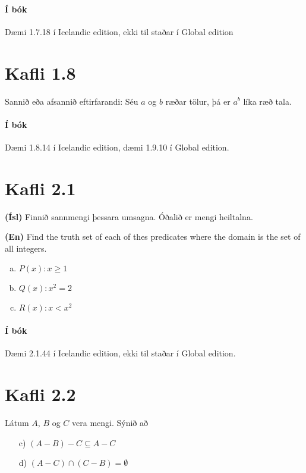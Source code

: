 \documentclass{article}
\begin{document}
\paragraph{Í bók} Dæmi 1.7.18 í Icelandic edition, ekki til staðar í Global edition

\section{Kafli 1.8}

\question

Sannið eða afsannið eftirfarandi: Séu $a$ og $b$ ræðar tölur, þá er $a^b$ líka ræð tala.

\paragraph{Í bók} Dæmi 1.8.14 í Icelandic edition, dæmi 1.9.10 í Global edition.

\section{Kafli 2.1}

\question 

\textbf{(Ísl)} Finnið sannmengi þessara umsagna. Óðalið er mengi heiltalna.

\textbf{(En)} Find the truth set of each of thes predicates where the domain is the set of all integers.

\begin{enumerate}[a)]
    \item $P(x): x \geq 1$
    \item $Q(x): x^2 = 2$
    \item $R(x): x < x^2$
\end{enumerate}

\paragraph{Í bók} Dæmi 2.1.44 í Icelandic edition, ekki til staðar í Global edition.

\section{Kafli 2.2}

\question Látum $A$, $B$ og $C$ vera mengi. Sýnið að

\begin{itemize}
    \item[c)] $(A - B) - C \subseteq A - C$
    \item[d)] $(A - C) \cap (C - B) = \emptyset$
\end{itemize}
\end{document}
